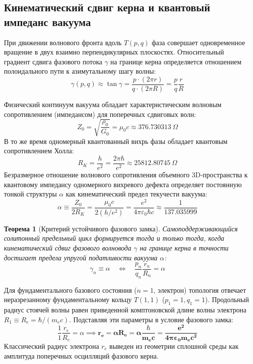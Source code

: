 \documentclass[12pt,a4paper]{article}
\newtheorem{theorem}{Теорема}
\begin{document}
	\subsection{Кинематический сдвиг керна и квантовый импеданс вакуума}
	При движении волнового фронта вдоль $T(p,q)$ фаза совершает одновременное вращение в двух взаимно перпендикулярных плоскостях. Относительный градиент сдвига фазового потока $\gamma$ на границе керна определяется отношением полоидального пути к азимутальному шагу волны:
	\begin{equation}
		\gamma(p,q) \approx \tan\gamma = \frac{p \cdot (2\pi r)}{q \cdot (2\pi R)} = \frac{p}{q} \frac{r}{R}
	\end{equation}
	
	Физический континуум вакуума обладает характеристическим волновым сопротивлением (импедансом) для поперечных сдвиговых волн:
	\begin{equation}
		Z_0 = \sqrt{\frac{\rho_0}{G_0}} = \mu_0 c \approx 376.730313 \ \Omega
	\end{equation}
	В то же время одномерный квантованный вихрь фазы обладает квантовым сопротивлением Холла:
	\begin{equation}
		R_K = \frac{h}{e^2} = \frac{2\pi \hbar}{e^2} \approx 25812.80745 \ \Omega
	\end{equation}
	Безразмерное отношение волнового сопротивления объемного 3D-пространства к квантовому импедансу одномерного вихревого дефекта определяет постоянную тонкой структуры $\alpha$ как кинематический предел текучести вакуума:
	\begin{equation}
		\alpha \equiv \frac{Z_0}{2 R_K} = \frac{\mu_0 c}{2 (h/e^2)} = \frac{e^2}{4\pi \varepsilon_0 \hbar c} \approx \frac{1}{137.035999}
	\end{equation}
	
	\begin{theorem}[Критерий устойчивого фазового замка]
		Самоподдерживающийся солитонный предельный цикл формируется тогда и только тогда, когда кинематический сдвиг фазового волновода $\gamma$ на границе керна в точности достигает предела упругой податливости вакуума $\alpha$:
		\begin{equation}
			\gamma_n \equiv \alpha \quad \Longleftrightarrow \quad \frac{p_n}{q_n} \frac{r_n}{R_n} = \alpha
		\end{equation}
	\end{theorem}
	
	Для фундаментального базового состояния ($n=1$, электрон) топология отвечает неразрезанному фундаментальному кольцу $T(1,1)$ ($p_1 = 1, q_1 = 1$). Продольный радиус стоячей волны равен приведенной комптоновской длине волны электрона $R_1 \equiv R_e = \hbar / (m_e c)$. Подставляя эти параметры в условие фазового замка:
	\begin{equation}
		\frac{1}{1} \frac{r_e}{R_e} = \alpha \implies \mathbf{r_e = \alpha R_e = \alpha \frac{\hbar}{m_e c} = \frac{e^2}{4\pi\varepsilon_0 m_e c^2}}
	\end{equation}
	Классический радиус электрона $r_e$ выведен из геометрии сплошной среды как амплитуда поперечных осцилляций фазового керна.
	
\end{document}
